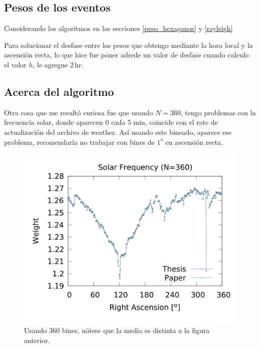 

	\subsection{Pesos de los eventos}

	Considerando los algoritmos en las secciones \ref{peso_hexagonos} y \ref{rayleigh}

		
		Para solucionar el desfase entre los pesos que obtengo mediante la hora local y la ascensión recta, lo que hice fue poner adrede un valor de desfase cuando calculo el valor $h$, le agregue $2\,$hr. 

\subsection{Acerca del algoritmo}



	Otra cosa que me resultó curiosa fue que usando $N=360$, tengo problemas con la frecuencia solar, donde aparecen 0 cada 5 min, coincide con el rate de actualización del archivo de weather. Así usando este bineado, aparece ese problema, recomendaría no trabajar con bines de $1^o$ en ascensión recta.
	\begin{figure}[H]
	\centering
	\includegraphics[width=\linewidth]{Graficos/solar_my_and_paper_in_360_2.png}
	\caption{Usando 360 bines, nótese que la media es distinta a la figura anterior.}
	\label{fig:solar_360}
	\end{figure}

